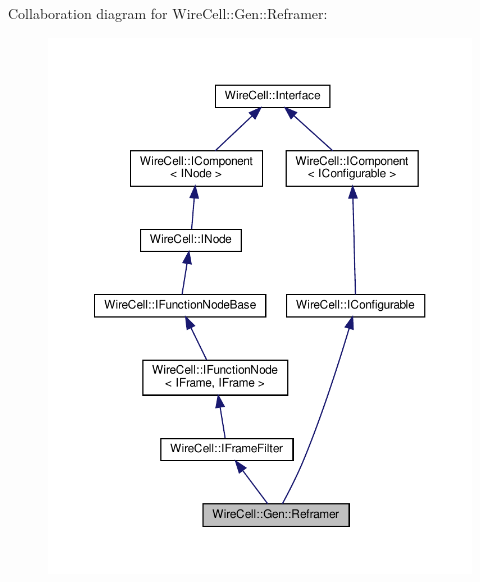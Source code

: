 Collaboration diagram for Wire\+Cell\+:\+:Gen\+:\+:Reframer\+:
\nopagebreak
\begin{figure}[H]
\begin{center}
\leavevmode
\includegraphics[width=350pt]{class_wire_cell_1_1_gen_1_1_reframer__coll__graph}
\end{center}
\end{figure}

